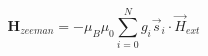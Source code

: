 \documentclass[preview]{standalone}
\begin{document}
\begin{varwidth}{50in}
  \begin{equation}
    \bm{H}_{zeeman} = -\mu_{B}\mu_0\sum_{i=0}^{N}g_{i} \vec{s}_{i} \cdot \vec{H}_{ext} \nonumber 
  \end{equation}
\end{varwidth}
\end{document}
